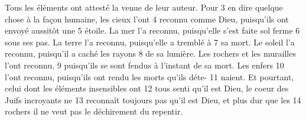 Tous les éléments ont attesté la venue de leur auteur. Pour	 
3	 	en dire quelque chose à la façon humaine, les cieux l'ont	 
4	 	reconnu comme Dieu, puisqu'ils ont envoyé aussitôt une	 
5	 	étoile. La mer l'a reconnu, puisqu'elle s'est faite sol ferme	 
6	 	sous ses pas. La terre l'a reconnu, puisqu'elle a tremblé à	 
7	 	sa mort. Le soleil l'a reconnu, puisqu'il a caché les rayons	 
8	 	de sa lumière. Les rochers et les murailles l'ont reconnu,	 
9	 	puisqu'ils se sont fendus à l'instant de sa mort. Les enfers	 
10	 	l'ont reconnu, puisqu'ils ont rendu les morts qu'ils déte-	 
11	 	naient. Et pourtant, celui dont les éléments insensibles ont	 
12	 	tous senti qu'il est Dieu, le coeur des Juifs incroyants ne	 
13	 	reconnaît toujours pas qu'il est Dieu, et plus dur que les	 
14	 	rochers il ne veut pas le déchirement du repentir.
